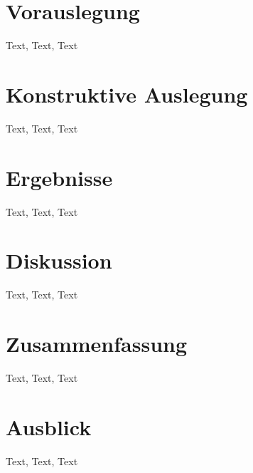 \documentclass[captions=tableheading, listof=leveldown, 11pt]{scrartcl}
\begin{document}
\section{Vorauslegung}
%
Text, Text, Text
\newpage
\section{Konstruktive Auslegung}
%
Text, Text, Text
\newpage
\section{Ergebnisse}
%
Text, Text, Text
\newpage
\section{Diskussion}
%
Text, Text, Text
\newpage
\section{Zusammenfassung}
%
Text, Text, Text
\newpage
\section{Ausblick}
%
Text, Text, Text
\newpage
\end{document}
